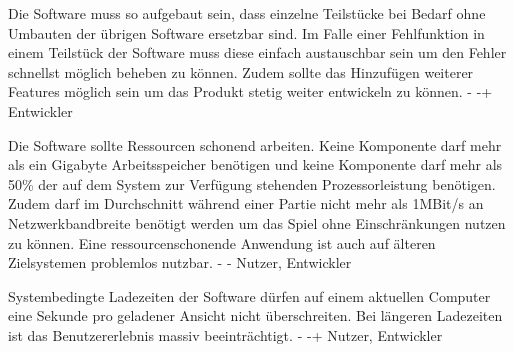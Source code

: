         {Die Software muss so aufgebaut sein, dass einzelne Teilstücke bei Bedarf ohne Umbauten der übrigen Software ersetzbar sind.}
        {Im Falle einer Fehlfunktion in einem Teilstück der Software muss diese einfach austauschbar sein um den Fehler schnellst möglich beheben zu können. Zudem sollte das Hinzufügen weiterer Features möglich sein um das Produkt stetig weiter entwickeln zu können.}
        {-}
        {-+}
        {Entwickler}

        {Die Software sollte Ressourcen schonend arbeiten. Keine Komponente darf mehr als ein Gigabyte Arbeitsspeicher benötigen und keine Komponente darf mehr als 50\% der auf dem System zur Verfügung stehenden Prozessorleistung benötigen. Zudem darf im Durchschnitt während einer Partie nicht mehr als 1MBit/s an Netzwerkbandbreite benötigt werden um das Spiel ohne Einschränkungen nutzen zu können.}
        {Eine ressourcenschonende Anwendung ist auch auf älteren Zielsystemen problemlos nutzbar.}
        {-}
        {-}
        {Nutzer, Entwickler}

        {Systembedingte Ladezeiten der Software dürfen auf einem aktuellen Computer eine Sekunde pro geladener Ansicht nicht überschreiten.}
        {Bei längeren Ladezeiten ist das Benutzererlebnis massiv beeinträchtigt.}
        {-}
        {-+}
        {Nutzer, Entwickler}
